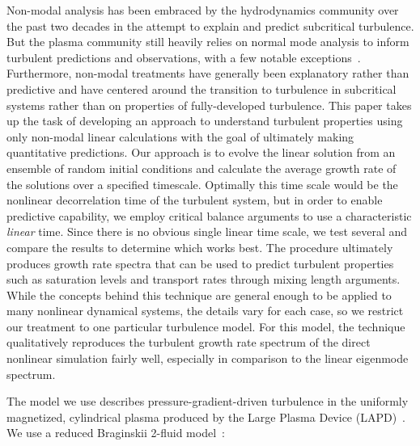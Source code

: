 \documentclass[letter,scriptaddress,twocolumn, prl,showkeys]{revtex4}
\begin{document}
Non-modal analysis has been embraced by the hydrodynamics community over the past two decades in the attempt to explain and predict subcritical turbulence. But the plasma community
still heavily relies on normal mode analysis to inform turbulent predictions and observations, with a few notable exceptions~\cite{camargo1998,camporeale2010,schekochihin2012}. 
Furthermore, non-modal treatments have generally been explanatory rather than predictive and have centered around the transition to turbulence in subcritical systems rather 
than on properties of fully-developed turbulence.
This paper takes up the task of developing an approach to understand turbulent properties using only non-modal linear calculations with the goal of 
ultimately making quantitative predictions. 
Our approach is to evolve the linear solution from an ensemble of random initial conditions 
and calculate the average growth rate of the solutions over a specified timescale.  Optimally this time scale would be the
nonlinear decorrelation time of the turbulent system, but in order to enable predictive capability, we employ critical balance
arguments to use a characteristic \emph{linear} time. Since there is no obvious single linear time scale, we test several and compare the results to determine which works best.
The procedure ultimately produces growth rate spectra that can be used to predict turbulent properties such as saturation levels and transport rates through mixing length arguments.
While the concepts behind this technique are general enough to be applied to many nonlinear dynamical systems, the details vary for each case, 
so we restrict our treatment to one particular turbulence model. For this model, the technique qualitatively reproduces the turbulent growth rate spectrum of the direct 
nonlinear simulation fairly well, especially in comparison to the linear eigenmode spectrum.

The model we use describes pressure-gradient-driven turbulence in the uniformly magnetized, cylindrical plasma
produced by the Large Plasma Device (LAPD)~\cite{gekelman1991}. 
We use a reduced Braginskii 2-fluid model~\cite{Popovich2010a,Popovich2010b,Umansky2011,friedman2012b,friedman2013}:
\end{document}
